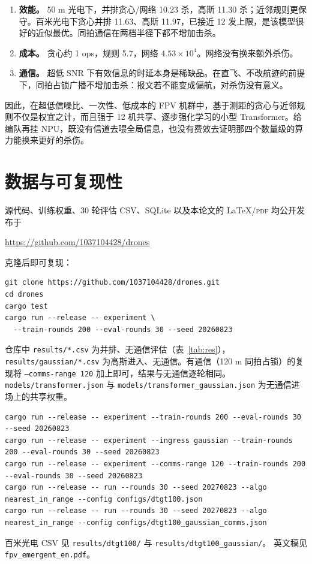 \documentclass[12pt,a4paper]{article}
\begin{document}
\begin{enumerate}
  \item \textbf{效能。} 50 m 光电下，并排贪心/网络 10.23 杀，高斯 11.30 杀；近邻规则更保守。百米光电下贪心并排 11.63、高斯 11.97，已接近 12 发上限，是该模型很好的近似最优。同拍通信在两档半径下都不增加击杀。
  \item \textbf{成本。} 贪心约 1 ops，规则 5.7，网络 $4.53\times 10^{4}$。网络没有换来额外杀伤。
  \item \textbf{通信。} 超低 SNR 下有效信息的时延本身是稀缺品。在直飞、不改航迹的前提下，同拍占锁广播不增加击杀：报文若不能变成偏航，对杀伤没有意义。
\end{enumerate}

因此，在超低信噪比、一次性、低成本的 FPV 机群中，基于测距的贪心与近邻规则不仅是权宜之计，而且强于 12 机共享、逐步强化学习的小型 Transformer。给编队再挂 NPU，既没有信道去喂全局信息，也没有费效去证明那四个数量级的算力能换来更好的杀伤。

\section*{数据与可复现性}

源代码、训练权重、30 轮评估 CSV、SQLite 以及本论文的 \LaTeX/\textsc{pdf} 均公开发布于
\begin{center}
\url{https://github.com/1037104428/drones}
\end{center}
克隆后即可复现：
\begin{verbatim}
git clone https://github.com/1037104428/drones.git
cd drones
cargo test
cargo run --release -- experiment \
  --train-rounds 200 --eval-rounds 30 --seed 20260823
\end{verbatim}
仓库中 \texttt{results/*.csv} 为并排、无通信评估（表~\ref{tab:res}），\texttt{results/gaussian/*.csv} 为高斯进入、无通信。有通信（120 m 同拍占锁）的复现将 \texttt{--comms-range 120} 加上即可，结果与无通信逐轮相同。\texttt{models/transformer.json} 与 \texttt{models/transformer\_gaussian.json} 为无通信进场上的共享权重。
\begin{verbatim}
cargo run --release -- experiment --train-rounds 200 --eval-rounds 30 --seed 20260823
cargo run --release -- experiment --ingress gaussian --train-rounds 200 --eval-rounds 30 --seed 20260823
cargo run --release -- experiment --comms-range 120 --train-rounds 200 --eval-rounds 30 --seed 20260823
cargo run --release -- run --rounds 30 --seed 20270823 --algo nearest_in_range --config configs/dtgt100.json
cargo run --release -- run --rounds 30 --seed 20270823 --algo nearest_in_range --config configs/dtgt100_gaussian_comms.json
\end{verbatim}
百米光电 CSV 见 \texttt{results/dtgt100/} 与 \texttt{results/dtgt100\_gaussian/}。
英文稿见 \texttt{fpv\_emergent\_en.pdf}。
\end{document}
